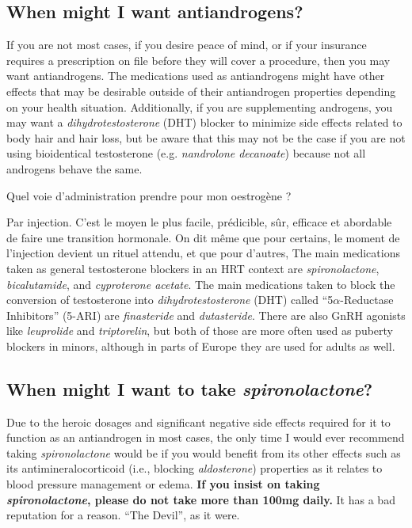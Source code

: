 \documentclass{article}
\begin{document}
{{\subsection{When might I want antiandrogens?}

If you are not most cases, if you desire peace of mind, or if your insurance requires a prescription on file before they will cover a procedure, then you may want antiandrogens. The medications used as antiandrogens might have other effects that may be desirable outside of their antiandrogen properties depending on your health situation. Additionally, if you are supplementing androgens, you may want a \textit{dihydrotestosterone }(DHT) blocker to minimize side effects related to body hair and hair loss, but be aware that this may not be the case if you are not using bioidentical testosterone (e.g. \textit{nandrolone decanoate}) because not all androgens behave the same.


Quel voie d'administration prendre pour mon oestrogène ?

Par injection. C'est le moyen le plus facile, prédicible, sûr, efficace et abordable de faire une transition hormonale. On dit même que pour certains, le moment de l'injection devient un rituel attendu, et que pour d'autres,  
The main medications taken as general testosterone blockers in an HRT context are \textit{spironolactone}, \textit{bicalutamide}, and \textit{cyproterone acetate}. The main medications taken to block the conversion of testosterone into \textit{dihydrotestosterone} (DHT) called “5$\alpha$-Reductase Inhibitors” (5-ARI) are \textit{finasteride} and \textit{dutasteride}. There are also GnRH agonists like \textit{leuprolide} and \textit{triptorelin}, but both of those are more often used as puberty blockers in minors, although in parts of Europe they are used for adults as well.

\subsection{When might I want to take \textit{spironolactone}?}

Due to the heroic dosages and significant negative side effects required for it to function as an antiandrogen in most cases, the only time I would ever recommend taking \textit{spironolactone} would be if you would benefit from its other effects such as its antimineralocorticoid (i.e., blocking \textit{aldosterone}) properties as it relates to blood pressure management or edema. \textbf{If you insist on taking \textit{spironolactone}, please do not take more than 100mg daily.} It has a bad reputation for a reason. “The Devil”, as it were.

}}
\end{document}
